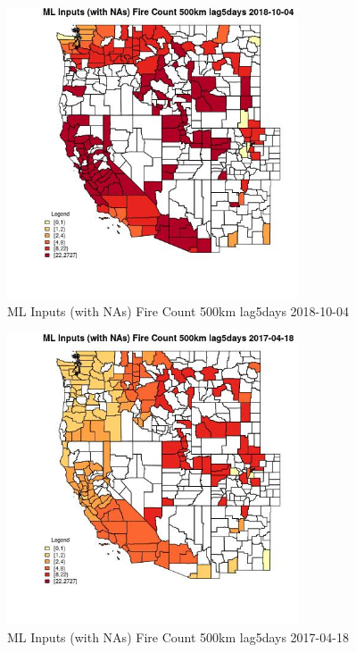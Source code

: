 \begin{figure} 
\centering  
\includegraphics[width=0.77\textwidth]{Code_Outputs/Report_ML_input_PM25_Step4_part_f_de_duplicated_aves_prioritize_24hr_obswNAs_CountyFire_Count_500km_lag5daysMean2018-10-04.jpg} 
\caption{\label{fig:Report_ML_input_PM25_Step4_part_f_de_duplicated_aves_prioritize_24hr_obswNAsCountyFire_Count_500km_lag5daysMean2018-10-04}ML Inputs (with NAs) Fire Count 500km lag5days 2018-10-04} 
\end{figure} 
 

\begin{figure} 
\centering  
\includegraphics[width=0.77\textwidth]{Code_Outputs/Report_ML_input_PM25_Step4_part_f_de_duplicated_aves_prioritize_24hr_obswNAs_CountyFire_Count_500km_lag5daysMean2017-04-18.jpg} 
\caption{\label{fig:Report_ML_input_PM25_Step4_part_f_de_duplicated_aves_prioritize_24hr_obswNAsCountyFire_Count_500km_lag5daysMean2017-04-18}ML Inputs (with NAs) Fire Count 500km lag5days 2017-04-18} 
\end{figure} 
 


